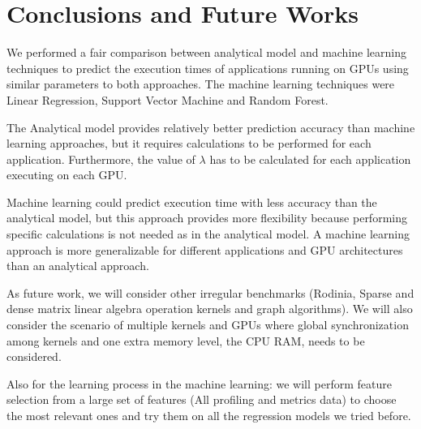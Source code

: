 \begin{table}[htpb]
\centering
\caption{Normalized MSE of the different techniques used}
\label{tab:Techniques} 
\end{table}

\section{Conclusions and Future Works}\label{sec:Conclusions}
We performed a fair comparison between analytical model and machine learning techniques to predict the execution times of applications running on GPUs using similar parameters to both approaches. The machine learning techniques were Linear Regression, Support Vector Machine and Random Forest.

The Analytical model provides relatively better prediction accuracy than machine learning approaches, but it requires calculations to be performed for each application. Furthermore, the value of $\lambda$ has to be calculated for each application executing on each GPU.

Machine learning could predict execution time with less accuracy than the analytical model, but this approach provides more flexibility because performing specific calculations is not needed as in the analytical model. A machine learning approach is more generalizable for different applications and GPU architectures than an analytical approach.

As future work, we will consider other irregular benchmarks (Rodinia, Sparse and dense matrix linear algebra operation kernels and graph algorithms). We will also consider the scenario of multiple kernels and GPUs where global synchronization among kernels and one extra memory level, the CPU RAM, needs to be considered.

Also for the learning process in the machine learning: we will perform feature selection from a large set of features (All profiling and metrics data) to choose the most relevant ones and try them on all the regression models we tried before.